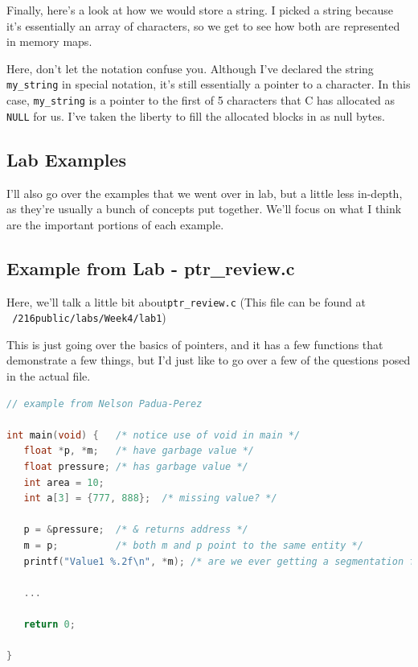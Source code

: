 \documentclass[english, 10pt]{article}
\begin{document}
Finally, here's a look at how we would store a string. I picked a string because it's essentially an array of characters, so we get to see how both are represented in memory maps. \newline

Here, don't let the notation confuse you. Although I've declared the string \texttt{my\_string} in special notation, it's still essentially a pointer to a character. In this case, \texttt{my\_string} is a pointer to the first of 5 characters that C has allocated as \texttt{NULL} for us. I've taken the liberty to fill the allocated blocks in as null bytes. 

\subsection{Lab Examples}

I'll also go over the examples that we went over in lab, but a little less in-depth, as they're usually a bunch of concepts put together. We'll focus on what I think are the important portions of each example.

\subsection{Example from Lab - ptr\_review.c}

Here, we'll talk a little bit about\texttt{ptr\_review.c} \newline (This file can be found at \texttt{~/216public/labs/Week4/lab1}) \newline

This is just going over the basics of pointers, and it has a few functions that demonstrate a few things, but I'd just like to go over a few of the questions posed in the actual file.

{
\centering
\begin{lstlisting}[language=C]
// example from Nelson Padua-Perez

int main(void) {   /* notice use of void in main */                                   
   float *p, *m;   /* have garbage value */                                           
   float pressure; /* has garbage value */                                            
   int area = 10;                                                                     
   int a[3] = {777, 888};  /* missing value? */                                       
                                                                                      
   p = &pressure;  /* & returns address */                                            
   m = p;          /* both m and p point to the same entity */                        
   printf("Value1 %.2f\n", *m); /* are we ever getting a segmentation fault?*/
   
   ...
	
   return 0;
   
}

\end{lstlisting}
}
\end{document}
